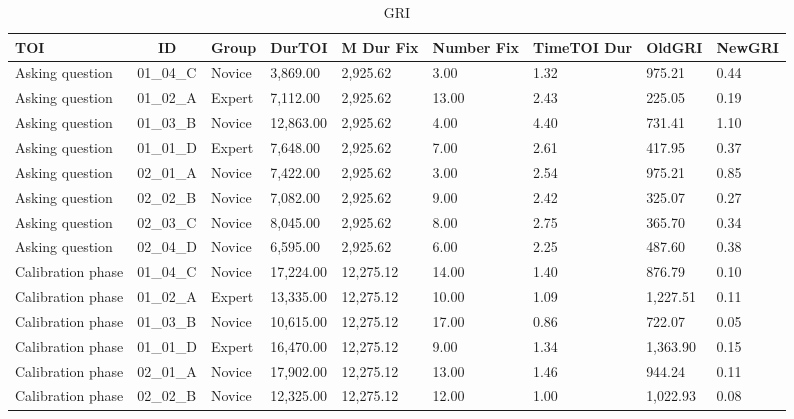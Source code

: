 \documentclass[
  english,
  man,floatsintext]{apa6}
\begin{document}
\begin{table}[h]

\begin{center}
\begin{threeparttable}

\caption{\label{tab:GRItable1}GRI}

\tiny{

\begin{tabular}{lllllllll}
\toprule
TOI & \multicolumn{1}{c}{ID} & \multicolumn{1}{c}{Group} & \multicolumn{1}{c}{DurTOI} & \multicolumn{1}{c}{M Dur Fix} & \multicolumn{1}{c}{Number Fix} & \multicolumn{1}{c}{TimeTOI Dur} & \multicolumn{1}{c}{OldGRI} & \multicolumn{1}{c}{NewGRI}\\
\midrule
Asking question & 01\_04\_C & Novice & 3,869.00 & 2,925.62 & 3.00 & 1.32 & 975.21 & 0.44\\
Asking question & 01\_02\_A & Expert & 7,112.00 & 2,925.62 & 13.00 & 2.43 & 225.05 & 0.19\\
Asking question & 01\_03\_B & Novice & 12,863.00 & 2,925.62 & 4.00 & 4.40 & 731.41 & 1.10\\
Asking question & 01\_01\_D & Expert & 7,648.00 & 2,925.62 & 7.00 & 2.61 & 417.95 & 0.37\\
Asking question & 02\_01\_A & Novice & 7,422.00 & 2,925.62 & 3.00 & 2.54 & 975.21 & 0.85\\
Asking question & 02\_02\_B & Novice & 7,082.00 & 2,925.62 & 9.00 & 2.42 & 325.07 & 0.27\\
Asking question & 02\_03\_C & Novice & 8,045.00 & 2,925.62 & 8.00 & 2.75 & 365.70 & 0.34\\
Asking question & 02\_04\_D & Novice & 6,595.00 & 2,925.62 & 6.00 & 2.25 & 487.60 & 0.38\\
Calibration phase & 01\_04\_C & Novice & 17,224.00 & 12,275.12 & 14.00 & 1.40 & 876.79 & 0.10\\
Calibration phase & 01\_02\_A & Expert & 13,335.00 & 12,275.12 & 10.00 & 1.09 & 1,227.51 & 0.11\\
Calibration phase & 01\_03\_B & Novice & 10,615.00 & 12,275.12 & 17.00 & 0.86 & 722.07 & 0.05\\
Calibration phase & 01\_01\_D & Expert & 16,470.00 & 12,275.12 & 9.00 & 1.34 & 1,363.90 & 0.15\\
Calibration phase & 02\_01\_A & Novice & 17,902.00 & 12,275.12 & 13.00 & 1.46 & 944.24 & 0.11\\
Calibration phase & 02\_02\_B & Novice & 12,325.00 & 12,275.12 & 12.00 & 1.00 & 1,022.93 & 0.08\\

\end{tabular}}
\end{threeparttable}
\end{center}
\end{table}
\end{document}
